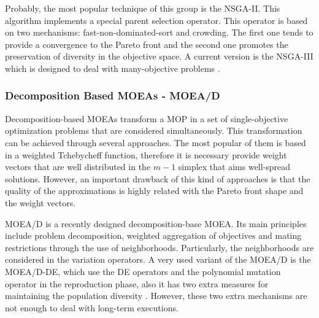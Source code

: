 %
Probably, the most popular technique of this group is the NSGA-II.
%
This algorithm \cite{Joel:NSGAII} implements a special parent selection operator.
%
This operator is based on two mechanisms: fast-non-dominated-sort and crowding.
%
The first one tends to provide a convergence to the Pareto front and the second one promotes the preservation of diversity in the objective space.
%
A current version is the NSGA-III which is designed to deal with many-objective problems \cite{horoba2008benefits}.
%

\subsubsection{Decomposition Based MOEAs - MOEA/D}

Decomposition-based MOEAs \cite{Joel:MOEAD} transform a MOP in a set of single-objective optimization problems that are considered simultaneously.
%
This transformation can be achieved through several approaches.
%
The most popular of them is based in a weighted Tchebycheff function, therefore it is necessary provide weight vectors that are well distributed in the $m-1$ simplex that aims well-spread solutions.
%
However, an important drawback of this kind of approaches is that the quality of the approximations is highly related with the Pareto front shape and the weight vectors.
%

MOEA/D \cite{Joel:MOEAD} is a recently designed decomposition-base MOEA.
%
Its main principles include problem decomposition, weighted aggregation of objectives and mating restrictions through the use of neighborhoods.
%
Particularly, the neighborhoods are considered in the variation operators.
%
A very used variant of the MOEA/D is the MOEA/D-DE, which use the DE operators \cite{price2006differential} and the polynomial mutation operator \cite{hamdan2012distribution} in the reproduction phase, also it has two extra measures for maintaining the population diversity \cite{zhang2009performance}.
%
However, these two extra mechanisms are not enough to deal with long-term executions.


